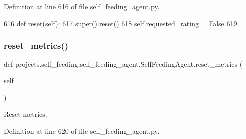 Definition at line 616 of file self\+\_\+feeding\+\_\+agent.\+py.


\begin{DoxyCode}
616     \textcolor{keyword}{def }reset(self):
617         super().reset()
618         self.requested\_rating = \textcolor{keyword}{False}
619 
\end{DoxyCode}
\mbox{\label{classprojects_1_1self__feeding_1_1self__feeding__agent_1_1SelfFeedingAgent_ada3fee611be323fc660f634f7e33d83e}} 
\subsubsection{\texorpdfstring{reset\+\_\+metrics()}{reset\_metrics()}}
{\footnotesize\ttfamily def projects.\+self\+\_\+feeding.\+self\+\_\+feeding\+\_\+agent.\+Self\+Feeding\+Agent.\+reset\+\_\+metrics (\begin{DoxyParamCaption}\item[{}]{self }\end{DoxyParamCaption})}

\begin{DoxyVerb}Reset metrics.
\end{DoxyVerb}
 

Definition at line 620 of file self\+\_\+feeding\+\_\+agent.\+py.


